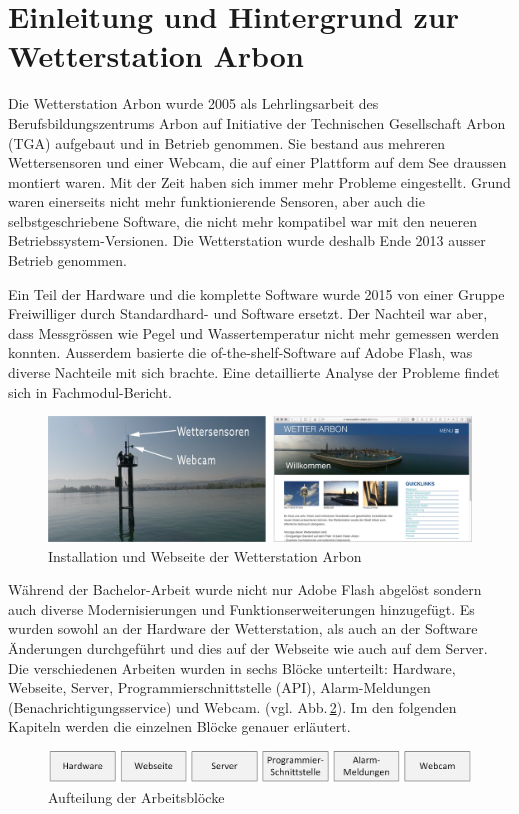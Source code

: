 \section*{Einleitung und Hintergrund zur Wetterstation Arbon}

Die Wetterstation Arbon wurde 2005 als Lehrlingsarbeit des Berufsbildungszentrums Arbon auf Initiative der Technischen Gesellschaft Arbon (TGA) aufgebaut und in Betrieb genommen. Sie bestand aus mehreren Wettersensoren und einer Webcam, die auf einer Plattform auf dem See draussen montiert waren. Mit der Zeit haben sich immer mehr Probleme eingestellt. Grund waren einerseits nicht mehr funktionierende Sensoren, aber auch die selbstgeschriebene Software, die nicht mehr kompatibel war mit den neueren Betriebssystem-Versionen. Die Wetterstation wurde deshalb Ende 2013 ausser Betrieb genommen.

Ein Teil der Hardware und die komplette Software wurde 2015 von einer Gruppe Freiwilliger durch Standardhard- und Software ersetzt. Der Nachteil war aber, dass Messgrössen wie Pegel und Wassertemperatur nicht mehr gemessen werden konnten. Ausserdem basierte die of-the-shelf-Software auf Adobe Flash, was diverse Nachteile mit sich brachte. Eine detaillierte Analyse der Probleme findet sich in Fachmodul-Bericht\cite{BilWie2018MUIu}.

\vspace{5mm} %
\begin{figure}[htbp!]
	\centering
	\includegraphics[width=1\linewidth]{img/kombi}
	\caption{Installation und Webseite der Wetterstation Arbon}
	\label{img:wetterstation}
\end{figure}
\vspace{3mm} %

\noindent
Während der Bachelor-Arbeit wurde nicht nur Adobe Flash abgelöst sondern auch diverse Modernisierungen und Funktionserweiterungen hinzugefügt. Es wurden sowohl an der Hardware der Wetterstation, als auch an der Software Änderungen durchgeführt und dies auf der Webseite wie auch auf dem Server. Die verschiedenen Arbeiten wurden in sechs Blöcke unterteilt: Hardware, Webseite, Server, Programmierschnittstelle (API), Alarm-Meldungen (Benachrichtigungsservice) und Webcam. (vgl. Abb.\,\ref{img:module}). Im den folgenden Kapiteln werden die einzelnen Blöcke genauer erläutert.

\vspace{5mm} %
\begin{figure}[htbp!]
	\centering
	\includegraphics[width=1\linewidth]{img/module}
	\caption{Aufteilung der Arbeitsblöcke}
	\label{img:module}
\end{figure}
\newpage
